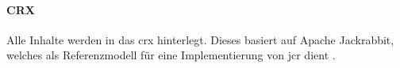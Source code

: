 \paragraph{CRX}
Alle Inhalte werden in das \ac{crx} hinterlegt. Dieses basiert auf Apache Jackrabbit, welches als Referenzmodell für eine Implementierung von \ac{jcr} dient \cite{Adobe2016b}. 